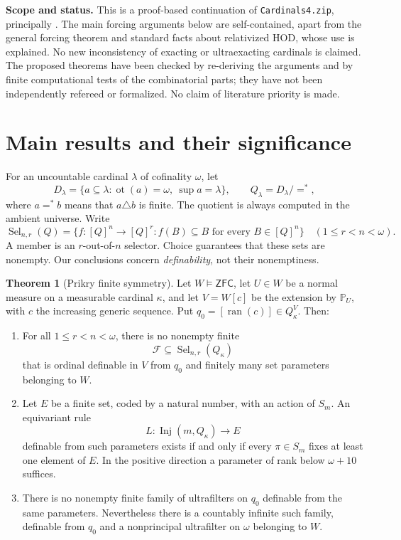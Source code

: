 \documentclass[11pt,letterpaper]{article}
\theoremstyle{definition}
\newtheorem{theorem}[definition]{Theorem}
\numberwithin{equation}{section}
\newcommand{\ZFC}{\mathsf{ZFC}}
\newcommand{\HOD}{\mathrm{HOD}}
\newcommand{\ot}{\operatorname{ot}}
\newcommand{\ran}{\operatorname{ran}}
\newcommand{\Sel}{\operatorname{Sel}}
\newcommand{\FFam}{\mathscr F}
\newcommand{\Inj}{\operatorname{Inj}}
\newcommand{\PPU}{\mathbb P_U}
\begin{document}
\textbf{Scope and status.} This is a proof-based continuation of \nolinkurl{Cardinals4.zip}, principally \cite[\S\S9, 12--13, 15]{synthesis}. The main forcing arguments below are self-contained, apart from the general forcing theorem and standard facts about relativized $\HOD$, whose use is explained. No new inconsistency of exacting or ultraexacting cardinals is claimed. The proposed theorems have been checked by re-deriving the arguments and by finite computational tests of the combinatorial parts; they have not been independently refereed or formalized. No claim of literature priority is made.

\newpage
\tableofcontents
\newpage

\section{Main results and their significance}\label{sec:main}

For an uncountable cardinal $\lambda$ of cofinality $\omega$, let
\[
 D_\lambda=\{a\subseteq\lambda:\ot(a)=\omega,\ \sup a=\lambda\},
 \qquad Q_\lambda=D_\lambda/{=^*},
\]
where $a=^*b$ means that $a\triangle b$ is finite. The quotient is always computed in the ambient universe. Write
\[
 \Sel_{n,r}(Q)=\{f:[Q]^n\longrightarrow[Q]^r:
                       f(B)\subseteq B\text{ for every }B\in[Q]^n\}
 \quad(1\le r<n<\omega).
\]
A member is an $r$-out-of-$n$ selector. Choice guarantees that these sets are nonempty. Our conclusions concern \emph{definability}, not their nonemptiness.

\begin{theorem}[Prikry finite symmetry]\label{thm:main}
Let $W\models\ZFC$, let $U\in W$ be a normal measure on a measurable cardinal $\kappa$, and let $V=W[c]$ be the extension by $\PPU$, with $c$ the increasing generic sequence. Put $q_0=[\ran(c)]\in Q_\kappa^V$. Then:
\begin{enumerate}
\item For all $1\le r<n<\omega$, there is no nonempty finite
\[
 \FFam\subseteq\Sel_{n,r}(Q_\kappa)
\]
that is ordinal definable in $V$ from $q_0$ and finitely many set parameters belonging to $W$.
\item Let $E$ be a finite set, coded by a natural number, with an action of $S_m$. An equivariant rule
\[
 L:\Inj(m,Q_\kappa)\longrightarrow E
\]
definable from such parameters exists if and only if every $\pi\in S_m$ fixes at least one element of $E$. In the positive direction a parameter of rank below $\omega+10$ suffices.
\item There is no nonempty finite family of ultrafilters on $q_0$ definable from the same parameters. Nevertheless there is a countably infinite such family, definable from $q_0$ and a nonprincipal ultrafilter on $\omega$ belonging to $W$.
\end{enumerate}
\end{theorem}
\end{document}
